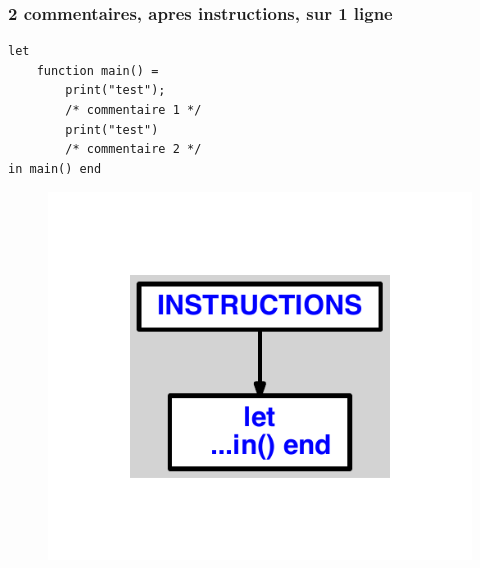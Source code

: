 \documentclass{article}
\begin{document}
\subsubsection{2 commentaires, apres instructions, sur 1 ligne}
\begin{lstlisting}
let
	function main() =
		print("test");
		/* commentaire 1 */
		print("test")
		/* commentaire 2 */
in main() end
\end{lstlisting}
\newpage
\begin{figure}[H]
\centering
\includegraphics[max width=\textwidth]{ast/ast_156.pdf}
\end{figure}
\newpage
\end{document}
